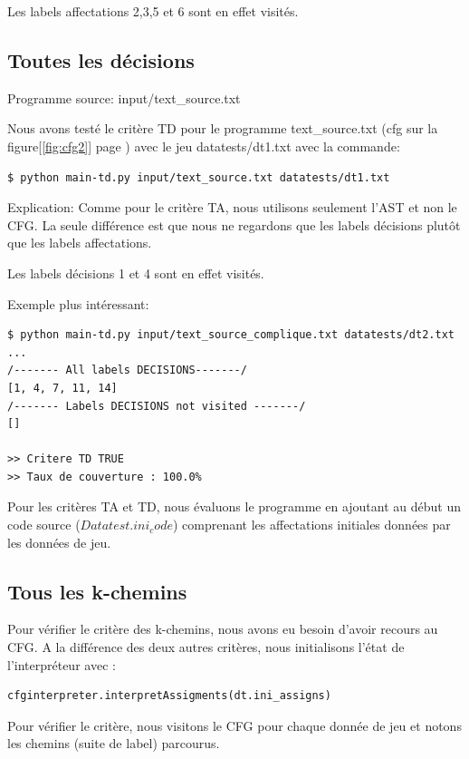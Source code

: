 \documentclass[a4paper]{article}
\begin{document}
Les labels affectations 2,3,5 et 6 sont en effet visités. 

\subsection{Toutes les décisions}

Programme source: input/text\_source.txt

Nous avons testé le critère TD pour le programme text\_source.txt (cfg sur la figure[\ref{fig:cfg2}] page \pageref{fig:cfg2}) avec le jeu datatests/dt1.txt avec la commande:

\begin{verbatim}
$ python main-td.py input/text_source.txt datatests/dt1.txt
\end{verbatim}

Explication: 
Comme pour le critère TA, nous utilisons seulement l'AST et non le CFG. La seule différence est que nous ne regardons que les labels décisions plutôt que les labels affectations. 

Les labels décisions 1 et 4 sont en effet visités. 

Exemple plus intéressant:
\begin{verbatim}
$ python main-td.py input/text_source_complique.txt datatests/dt2.txt
...
/------- All labels DECISIONS-------/
[1, 4, 7, 11, 14]
/------- Labels DECISIONS not visited -------/
[]

>> Critere TD TRUE
>> Taux de couverture : 100.0%

\end{verbatim}

Pour les critères TA et TD, nous évaluons le programme en ajoutant au début un code source ($Datatest.ini_code$) comprenant les affectations initiales données par les données de jeu. 

\subsection{Tous les k-chemins}

Pour vérifier le critère des k-chemins, nous avons eu besoin d'avoir recours au CFG. A la différence des deux autres critères, nous initialisons l'état de l’interpréteur avec :
\begin{verbatim}
cfginterpreter.interpretAssigments(dt.ini_assigns)
\end{verbatim}

Pour vérifier le critère, nous visitons le CFG pour chaque donnée de jeu et notons les chemins (suite de label) parcourus. 
\end{document}
